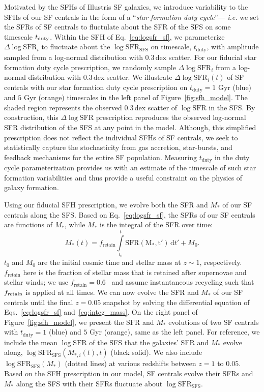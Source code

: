 \documentclass[12pt, letterpaper, preprint, tighten]{aastex62}
\newcommand{\edt}[1]{{\color{dred}{\bf} #1}}
\newcommand{\beq}{\begin{equation}}
\newcommand{\eeq}{\end{equation}}
\newcommand{\logsfr}{\log\mathrm{SFR}}
\newcommand{\logsfrsfs}{\log\mathrm{SFR}_\mathrm{SFS}}
\begin{document}
Motivated by the SFHs of Illustris SF galaxies, we introduce variability
to the SFHs of our SF centrals in the form of a ``\emph{star formation duty cycle}''--- 
\edt{\emph{i.e.} we set the SFRs of SF centrals to fluctulate about 
the SFR of the SFS on some timescale $t_{\rm duty}$.}
Within the SFH of Eq.~\ref{eq:logsfr_sf}, we parameterize $\Delta \logsfr_i$ to
fluctuate about the $\logsfrsfs$ on timescale, $t_\mathrm{duty}$, with
amplitude sampled from a log-normal distribution with $0.3\,\mathrm{dex}$
scatter. For our fiducial star formation duty cycle prescription, we randomly
sample $\Delta \logsfr_i$ from a log-normal distribution with $0.3\,\mathrm{dex}$ scatter.
We illustrate $\Delta \logsfr_i(t)$ of SF centrals with our star formation
duty cycle prescription on $t_\mathrm{duty}=1$ Gyr (blue) and $5$ Gyr (orange)
timescales in the left panel of Figure~\ref{fig:sfh_model}.
The shaded region represents the observed $0.3\,\mathrm{dex}$ scatter of
$\logsfr$ in the SFS. By construction, this $\Delta \logsfr$ prescription
reproduces the observed log-normal SFR distribution of the SFS at any point in 
the model. Although, this simplified prescription does not reflect the individual 
SFHs of SF centrals, we seek to statistically capture the stochasticity from 
gas accretion, star-bursts, and feedback mechanisms for the entire SF population.
Measuring $t_\mathrm{duty}$ in the duty cycle parameterization provides us with 
an estimate of the timescale of such star formation variabilities and thus provide 
a useful constraint on the physics of galaxy formation.

Using our fiducial SFH prescription, we evolve both the SFR and $M_*$
of our SF centrals along the SFS. Based on Eq.~\ref{eq:logsfr_sf},
the SFRs of our SF centrals are functions of $M_*$, while $M_*$
is the integral of the SFR over time:
\beq \label{eq:integ_mass}
M_*(t) = f_\mathrm{retain} \int\limits_{t_0}^{t} \mathrm{SFR(M_*, t')}\,\mathrm{d}t' + M_0.
\eeq
$t_0$ and $M_0$ are the initial cosmic time and stellar mass at $z \sim 1$,
respectively. $f_\mathrm{retain}$ here is the fraction of stellar mass
that is retained after supernovae and stellar winds; we use
$f_\mathrm{retain} = 0.6$~\citep{wetzel2013} 
\edt{and assume instantaneous recycling such that $f_{\rm retain}$ is applied at all times.}
We can now evolve the SFR and
$M_*$ of our SF centrals until the final $z=0.05$ snapshot by
solving the differential equation of Eqs.~\ref{eq:logsfr_sf} and~\ref{eq:integ_mass}.
On the right panel of Figure~\ref{fig:sfh_model}, we present the
$\mathrm{SFR}$ and $M_*$ evolutions of two SF centrals with
$t_\mathrm{duty}=1$ (blue) and $5$ Gyr (orange), same
as the left panel. For reference, we include the mean $\logsfr$ of the SFS
that the galaxies' SFR and $M_*$ evolve along, $\logsfrsfs(M_{*,i}(t), t)$
(black solid). We also include $\logsfrsfs(M_*)$ (dotted lines) at various
redshifts between $z = 1$ to $0.05$. Based on the SFH prescription in our
model, SF centrals evolve their SFRs and $M_*$ along the SFS
with their SFRs fluctuate about $\logsfrsfs$.
\end{document}
